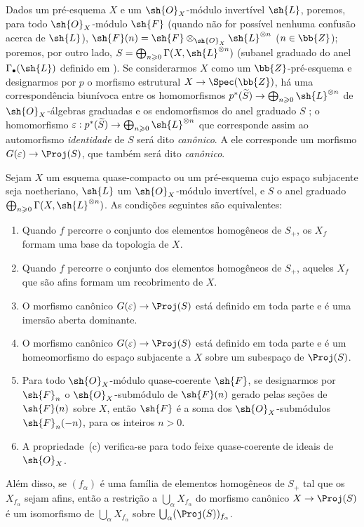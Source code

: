 \documentclass[oneside,10pt]{amsart}
\makeatletter
\renewcommand{\geq}{\geqslant}
\newcommand{\ega@arrow}[2]{\mathchoice{#1}{#2}{#2}{#2}}
\renewcommand{\to}{\ega@arrow{\longrightarrow}{\rightarrow}}
\newcommand{\oldpage}[2][]{\marginnote{\normalfont\footnotesize\textbf{#1}~|~#2}\ignorespaces}
\let\EGAOriginalLabel\label
\renewcommand{\label}[1]{\phantomsection\EGAOriginalLabel{#1}}
\makeatother
\begin{document}
\begin{env}[4.5.1]
\label{II.4.5.1}
Dados um pré-esquema $X$ e um $\sh{O}_X$-módulo invertível $\sh{L}$, poremos, para todo $\sh{O}_X$-módulo $\sh{F}$ (quando não for possível nenhuma confusão acerca de $\sh{L}$), $\sh{F}(n)=\sh{F}\otimes_{\sh{O}_X}\sh{L}^{\otimes n}$ ($n\in\bb{Z}$);
poremos, por outro lado, $S=\bigoplus_{n\geq0}\Gamma(X,\sh{L}^{\otimes n})$ (subanel graduado do anel $\Gamma_\bullet(\sh{L})$ definido em ).
Se considerarmos $X$ como um $\bb{Z}$-pré-esquema e designarmos por $p$ o morfismo estrutural $X\to\Spec(\bb{Z})$, há uma correspondência biunívoca entre os homomorfismos $p^*(\widetilde{S})\to\bigoplus_{n\geq0}\sh{L}^{\otimes n}$ de $\sh{O}_X$-álgebras graduadas e os endomorfismos do anel graduado $S$ ;
o homomorfismo $\varepsilon:p^*(\widetilde{S})\to\bigoplus_{n\geq0}\sh{L}^{\otimes n}$ que corresponde assim ao automorfismo \emph{identidade} de $S$ será dito \emph{canônico}.
A ele corresponde  um morfismo $G(\varepsilon)\to\Proj(S)$, que também será dito \emph{canônico}.
\end{env}

\begin{theorem}[4.5.2]
\label{II.4.5.2}
Sejam $X$ um esquema quase-compacto ou um pré-esquema cujo espaço subjacente seja noetheriano, $\sh{L}$ um $\sh{O}_X$-módulo invertível, e $S$ o anel graduado $\bigoplus_{n\geq0}\Gamma(X,\sh{L}^{\otimes n})$.
As condições seguintes são equivalentes:
\begin{enumerate}
  \item[\rm{(a)}] Quando $f$ percorre o conjunto dos elementos homogêneos de $S_+$, os $X_f$ formam uma base da topologia de $X$.
  \item[\rm{(a')}] Quando $f$ percorre o conjunto dos elementos homogêneos de $S_+$, aqueles $X_f$ que são afins formam um recobrimento de $X$.
  \item[\rm{(b)}] O morfismo canônico $G(\varepsilon)\to\Proj(S)$  está definido em toda parte e é uma imersão aberta dominante.
\oldpage[II]{84}
  \item[\rm{(b')}] O morfismo canônico $G(\varepsilon)\to\Proj(S)$ está definido em toda parte e é um homeomorfismo do espaço subjacente a $X$ sobre um subespaço de $\Proj(S)$.
  \item[\rm{(c)}] Para todo $\sh{O}_X$-módulo quase-coerente $\sh{F}$, se designarmos por $\sh{F}_n$ o $\sh{O}_X$-submódulo de $\sh{F}(n)$ gerado pelas seções de $\sh{F}(n)$ sobre $X$, então $\sh{F}$ é a soma dos $\sh{O}_X$-submódulos $\sh{F}_n(-n)$, para os inteiros $n>0$.
  \item[\rm{(c')}] A propriedade~\rm{(c)} verifica-se para todo feixe quase-coerente de ideais de $\sh{O}_X$.
\end{enumerate}

Além disso, se $(f_\alpha)$ é uma família de elementos homogêneos de $S_+$ tal que os $X_{f_\alpha}$ sejam afins, então a restrição a $\bigcup_\alpha X_{f_\alpha}$ do morfismo canônico $X\to\Proj(S)$ é um isomorfismo de $\bigcup_\alpha X_{f_\alpha}$ sobre $\bigcup_\alpha(\Proj(S))_{f_\alpha}$.
\end{theorem}
\end{document}
